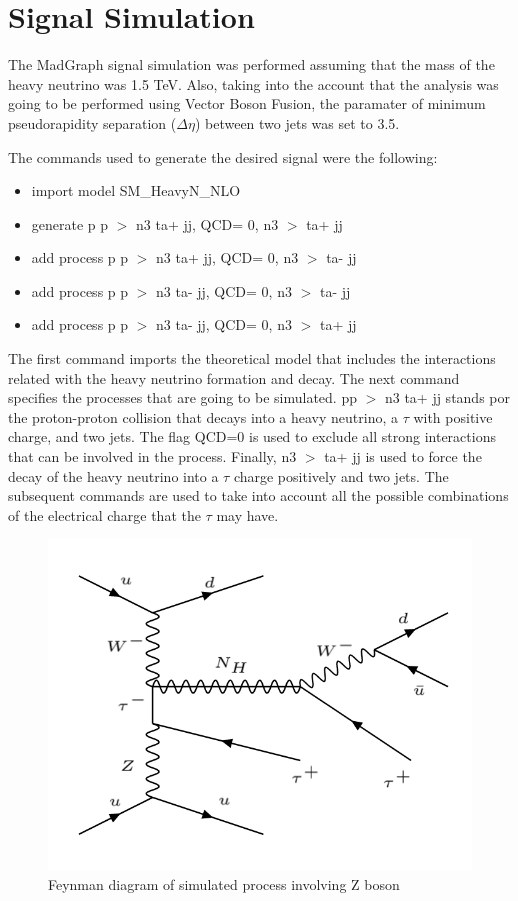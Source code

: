 \chapter{Signal Simulation} \label{sec: mgsim}

The MadGraph signal simulation was performed assuming that the mass of the heavy neutrino was 1.5 TeV. Also, taking into the account that the analysis was going to be performed using Vector Boson Fusion, the paramater of minimum pseudorapidity separation ($\Delta \eta$) between two jets was set to 3.5.

The commands used to generate the desired signal were the following:

\begin{itemize}
\item import model SM\_HeavyN\_NLO
\item generate p p $>$ n3 ta+ jj, QCD= 0, n3 $>$ ta+ jj
\item add process p p $>$ n3 ta+ jj, QCD= 0, n3 $>$ ta- jj
\item add process p p $>$ n3 ta- jj, QCD= 0, n3 $>$ ta- jj
\item add process p p $>$ n3 ta- jj, QCD= 0, n3 $>$ ta+ jj

\end{itemize}

The first command imports the theoretical model that includes the interactions related with the heavy neutrino formation and decay. The next command specifies the processes that are going to be simulated. pp $>$ n3 ta+ jj stands por the proton-proton collision that decays into a heavy neutrino, a $\tau$ with positive charge, and two jets. The flag QCD=0 is used to exclude all strong interactions that can be involved in the process. Finally, n3 $>$ ta+ jj is used to force the decay of the heavy neutrino into a $\tau$ charge positively and two jets. The subsequent commands are used to take into account all the possible combinations of the electrical charge that the $\tau$ may have.

\begin{figure}[H]
\centering
\includegraphics[scale = 0.45]{Figures/Feynman_hnZ}
\caption{Feynman diagram of simulated process involving Z boson}
\label{fig: hnZ}
\end{figure}

